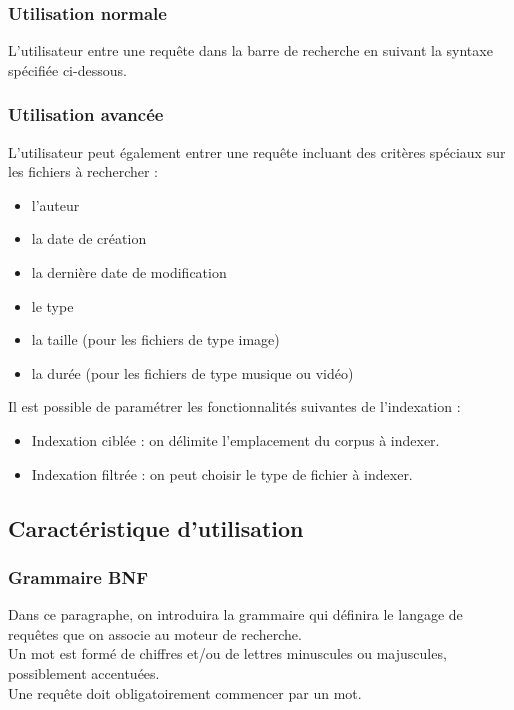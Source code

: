\documentclass[a4paper,10pt]{article}
\begin{document}
\subsubsection{Utilisation normale}
L'utilisateur entre une requête dans la barre de recherche en suivant la syntaxe 
spécifiée ci-dessous.

\subsubsection{Utilisation avancée}
L'utilisateur peut également entrer une requête incluant des critères spéciaux
sur les fichiers à rechercher :
\begin{itemize}
 \item l'auteur
 \item la date de création
 \item la dernière date de modification
 \item le type
 \item la taille (pour les fichiers de type image)
 \item la durée (pour les fichiers de type musique ou vidéo)
\end{itemize}
Il est possible de paramétrer les fonctionnalités suivantes de l'indexation :
\begin{itemize}
 \item Indexation ciblée : on délimite l'emplacement du corpus à indexer.
 \item Indexation filtrée : on peut choisir le type de fichier à indexer.
\end{itemize}


\subsection{Caractéristique d'utilisation}

\subsubsection{Grammaire BNF}
Dans ce paragraphe, on introduira la grammaire qui définira le langage de requêtes que on associe au moteur de recherche.\\

Un mot est formé de chiffres et/ou de lettres minuscules ou majuscules, possiblement accentuées.\\

Une requête doit obligatoirement commencer par un mot.\\
\end{document}
